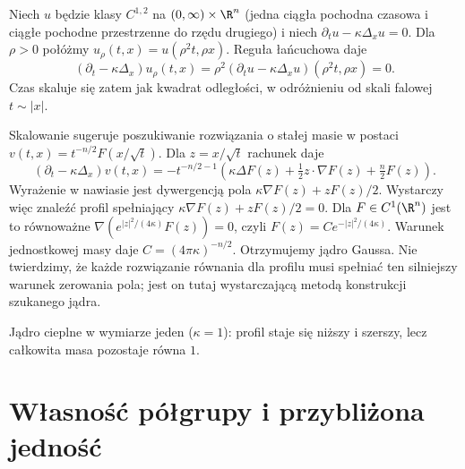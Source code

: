 \begin{uwaga}
Niech $u$ będzie klasy $C^{1,2}$ na
$(0,\infty)\times\R^n$ (jedna ciągła pochodna
czasowa i ciągłe pochodne przestrzenne do rzędu
drugiego) i niech $\partial_tu-\kappa\Delta_xu=0$.
Dla $\rho>0$ połóżmy $u_\rho(t,x)=u(\rho^2t,\rho x)$.
Reguła łańcuchowa daje
\[
 (\partial_t-\kappa\Delta_x)u_\rho(t,x)
 =\rho^2(\partial_tu-\kappa\Delta_xu)(\rho^2t,\rho x)=0.
\]
Czas skaluje się zatem jak kwadrat odległości,
w odróżnieniu od skali falowej $t\sim|x|$.

Skalowanie sugeruje poszukiwanie rozwiązania o stałej
masie w postaci $v(t,x)=t^{-n/2}F(x/\sqrt t)$.
Dla $z=x/\sqrt t$ rachunek daje
\[
 (\partial_t-\kappa\Delta_x)v(t,x)
 =-t^{-n/2-1}
 \left(\kappa\Delta F(z)+\tfrac12 z\cdot\nabla F(z)
 +\tfrac n2 F(z)\right).
\]
Wyrażenie w nawiasie jest dywergencją pola
$\kappa\nabla F(z)+zF(z)/2$.
Wystarczy więc znaleźć profil spełniający
$\kappa\nabla F(z)+zF(z)/2=0$.
Dla $F\in C^1(\R^n)$ jest to równoważne
$\nabla(e^{|z|^2/(4\kappa)}F(z))=0$, czyli
$F(z)=C e^{-|z|^2/(4\kappa)}$.
Warunek jednostkowej masy daje
$C=(4\pi\kappa)^{-n/2}$.
Otrzymujemy jądro Gaussa. Nie twierdzimy, że każde
rozwiązanie równania dla profilu musi spełniać ten
silniejszy warunek zerowania pola; jest on tutaj
wystarczającą metodą konstrukcji szukanego jądra.
\end{uwaga}

\begin{center}
\par\smallskip\small
Jądro cieplne w wymiarze jeden ($\kappa=1$): profil
staje się niższy i szerszy, lecz całkowita masa pozostaje równa $1$.
\end{center}

\section{Własność półgrupy i przybliżona jedność}
\label{sec:pde4-semigroup}


